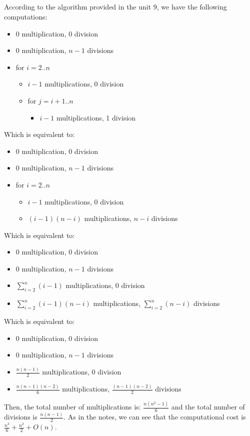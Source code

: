 \documentclass{llncs}\usepackage[]{graphicx}\usepackage[]{color}
\begin{document}
\subsection{}
According to the algorithm provided in the unit 9, we have the following computations:
\begin{itemize}
\item 0 multiplication, 0 division
\item 0 multiplication, $n-1$ divisions
\item for $i = 2..n$
\begin{itemize}
\item $i-1$ multiplications, 0 division
\item for $j = i+1..n$
\begin{itemize}
\item $i-1$ multiplications, 1 division
\end{itemize}
\end{itemize}
\end{itemize}
Which is equivalent to:
\begin{itemize}
\item 0 multiplication, 0 division
\item 0 multiplication, $n-1$ divisions
\item for $i = 2..n$
\begin{itemize}
\item $i-1$ multiplications, 0 division
\item $(i-1)(n-i)$ multiplications, $n-i$ divisions
\end{itemize}
\end{itemize}
Which is equivalent to:
\begin{itemize}
\item 0 multiplication, 0 division
\item 0 multiplication, $n-1$ divisions
\item $\sum_{i=2}^{n} (i-1)$ multiplications, 0 division
\item $\sum_{i=2}^{n}(i-1)(n-i)$ multiplications, $\sum_{i=2}^{n}(n-i)$ divisions
\end{itemize}
Which is equivalent to:
\begin{itemize}
\item 0 multiplication, 0 division
\item 0 multiplication, $n-1$ divisions
\item $\frac{n(n-1)}{2}$ multiplications, 0 division
\item $\frac{n(n-1)(n-2)}{6}$ multiplications, $\frac{(n-1)(n-2)}{2}$ divisions
\end{itemize}
Then, the total number of multiplications is: $\frac{n(n^{2}-1)}{6}$ and the total number of divisions is $\frac{n(n-1)}{2}$. As in the notes, we can see that the computational cost is $\frac{n^{3}}{6}+\frac{n^{2}}{2}+O(n)$.
\end{document}
